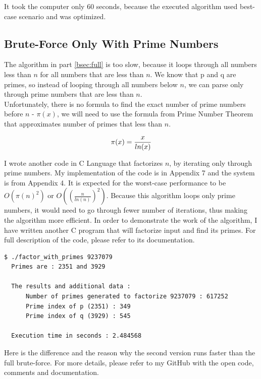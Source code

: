 \documentclass[a4paper, 12pt]{article}
\begin{document}
It took the computer only 60 seconds, because the executed algorithm used best-case scenario and was optimized.\cite{github}

\subsection{Brute-Force Only With Prime Numbers}
\label{bsec:primes}

The algorithm in part \ref{bsec:full} is too slow, because it loops through all numbers less than $n$ for all
numbers that are less than $n$. We know that p and q are primes, so instead of looping through all
numbers below $n$, we can parse only through prime numbers that are less than $n$.\\
Unfortunately, there is no formula to find the exact number of prime numbers before $n$ - $\pi(x)$, we will need to use
the formula from Prime Number Theorem that approximates number of primes that less than $n$\cite{pi}.

\begin{equation}
  \pi(x)=\frac{x}{ln(x)}\\
  \end{equation}

I wrote another code in C\cite{Clang} Language that factorizes $n$, by iterating only through prime
numbers. My implementation of the code is in Appendix 7 and the system is from Appendix 4.
It is expected for the worst-case performance to be $O(\pi(n)^2)$ or $O((\frac{n}{ln(n)})^2)$.
Because this algorithm loops only prime
numbers, it would need to go through fewer number of iterations, thus making the algorithm more efficient.
In order to demonstrate the work of the algorithm, I have written another C program that will factorize
input and find its primes. For full description of the code, please refer to its documentation.

\begin{lstlisting}[caption=Demonstartion of Prime Factorization with Primes]
  $ ./factor_with_primes 9237079
  Primes are : 2351 and 3929

  The results and additional data :
      Number of primes generated to factorize 9237079 : 617252
      Prime index of p (2351) : 349
      Prime index of q (3929) : 545
      
  Execution time in seconds : 2.484568
  \end{lstlisting}

Here is the difference and the reason why the second version runs faster than the full brute-force.
For more details, please refer to my GitHub with the open code, comments and documentation. 
\end{document}
